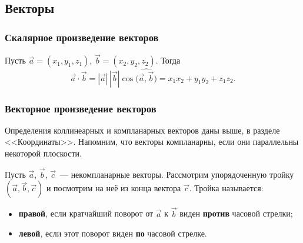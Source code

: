 \documentclass[12pt]{article}
\begin{document}
    \subsection{Векторы}
    
    \subsubsection{Скалярное произведение векторов}
    
    \begin{definition}
    	Пусть $\vec{a} = (x_1, y_1, z_1)$, $\vec{b} = (x_2, y_2, z_2)$. Тогда
    	\[
    		\vec{a} \cdot \vec{b} = |\vec{a}| \, |\vec{b}| \cos \bigl( \widehat{\vec{a}, \vec{b}} \bigr) = x_1x_2 + y_1y_2 + z_1z_2.
    	\]
    \end{definition}
    
    \subsubsection{Векторное произведение векторов}
    
    \begin{note}
    	Определения коллинеарных и компланарных векторов даны выше, в разделе <<Координаты>>. Напомним, что векторы компланарны, если они параллельны некоторой плоскости.
    \end{note}
    
    \begin{definition}
    	Пусть $\vec{a}$, $\vec{b}$, $\vec{c}$~--- некомпланарные векторы. Рассмотрим упорядоченную тройку $(\vec{a}, \vec{b}, \vec{c})$ и посмотрим на неё из конца вектора $\vec{c}$. Тройка называется:
    	\begin{itemize}
    		\item \textbf{правой}, если кратчайший поворот от $\vec{a}$ к $\vec{b}$ виден \textbf{против} часовой стрелки;
    		\item \textbf{левой}, если этот поворот виден \textbf{по} часовой стрелке.
    	\end{itemize}
    \end{definition}
    
\end{document}
